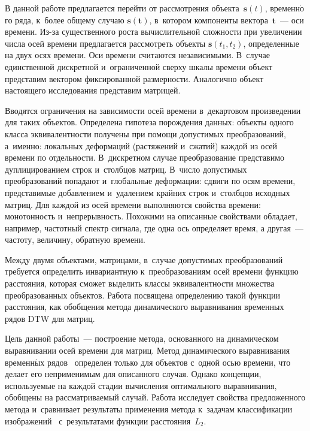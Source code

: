 \begin{multicols}{2}
В данной работе предлагается перейти от рас\-смот\-ре\-ния объекта~$\textbf{s}(t)$, 
временн$\acute{\mbox{о}}$го ряда, к~более общему случаю $\textbf{s}(\textbf{t})$, 
в~котором компоненты вектора~$\textbf{t}$~--- оси времени. Из-за 
существенного рос\-та вы\-чис\-ли\-тель\-ной слож\-ности при увеличении чис\-ла 
осей времени предлагается рас\-смот\-реть объекты $\textbf{s}(t_1, t_2)$, 
определенные на двух осях времени. Оси времени считаются независимыми. 
В~случае единственной дискретной и~ограниченной сверху шкалы времени 
объект представим вектором фиксированной размерности. 
Аналогично объект настоящего исследования представим мат\-ри\-цей.

Вводятся ограничения на зависимости осей времени в~декартовом 
произведении для таких объектов. Определена гипотеза порождения данных: 
объекты одного класса эквивалентности получены при помощи допустимых 
преобразований, а~именно: локальных деформаций (растяжений и~сжатий) 
каждой из осей времени по отдельности. В~дискретном случае преобразование 
представимо дуп\-ли\-ци\-ро\-ва\-ни\-ем строк и~столбцов матриц. 
В~число допустимых преобразований попадают и~глобальные деформации: 
сдвиги по осям времени, представимые добавлением и~удалением крайних 
строк и~столбцов исходных матриц. Для каждой из осей времени выполняются 
свойства времени: монотонность и~непрерывность. Похожими на описанные 
свойствами обладает, например, частотный спектр сигнала, где одна ось 
определяет время, а другая~--- частоту, величину, обратную времени.


Между двумя объектами, матрицами, в~случае допустимых преобразований 
требуется определить инвариантную к~преобразованиям осей времени функцию 
расстояния, которая сможет выделить классы эквивалентности множества 
преобразованных объектов. Работа посвящена определению такой функции 
расстояния, как обобщения метода динамического выравнивания временных рядов 
DTW для матриц.

Цель данной работы~--- построение метода, основанного на динамическом 
выравнивании осей времени для матриц. Метод динамического выравнивания 
временн$\acute{\mbox{ы}}$х рядов~\cite{33} определен только для объектов с~одной осью времени, 
что делает его неприменимым для описанного случая. Однако концепции, 
используемые на каждой стадии вы\-чис\-ле\-ния оптимального выравнивания, обобщены 
на рассматриваемый случай. Работа исследует свойства предложенного 
метода и~сравнивает результаты применения метода к~задачам классификации 
изображений~\cite{12} с~результатами функции расстояния~$L_2$.


\end{multicols}
